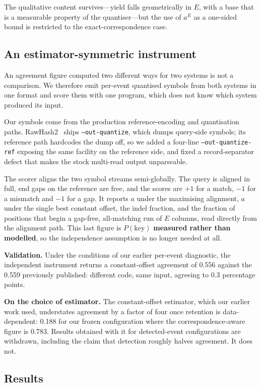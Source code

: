 \documentclass[conference]{IEEEtran}
\begin{document}
The qualitative content survives---yield falls geometrically in $E$, with a base that is a
measurable property of the quantiser---but the use of $a^{E}$ as a one-sided bound is restricted
to the exact-correspondence case.

\subsection{An estimator-symmetric instrument}

An agreement figure computed two different ways for two systems is not a comparison. We
therefore emit per-event quantised symbols from both systems in one format and score them with
one program, which does not know which system produced its input.

Our symbols come from the production reference-encoding and quantisation paths.
RawHash2~\cite{rawhash2} ships
\texttt{--out-quantize}, which dumps query-side symbols; its reference path hardcodes the dump
off, so we added a four-line \texttt{--out-quantize-ref} exposing the same facility on the
reference side, and fixed a record-separator defect that makes the stock multi-read output
unparseable.

The scorer aligns the two symbol streams semi-globally. The query is aligned in full, end gaps
on the reference are free, and the scores are $+1$ for a match, $-1$ for a mismatch and $-1$
for a gap. It reports $a$ under the maximising alignment, $a$ under the single best constant
offset, the indel fraction, and the fraction of positions that begin a gap-free, all-matching
run of $E$ columns, read directly from the alignment path. This last figure is
$P(\mathrm{key})$ \textbf{measured rather than modelled}, so the independence assumption is no
longer needed at all.

\textbf{Validation.} Under the conditions of our earlier per-event diagnostic, the independent
instrument returns a constant-offset agreement of 0.556 against the 0.559 previously published:
different code, same input, agreeing to 0.3 percentage points.

\textbf{On the choice of estimator.} The constant-offset estimator, which our earlier work used,
understates agreement by a factor of four once retention is data-dependent: 0.188 for our frozen
configuration where the correspondence-aware figure is 0.783. Results obtained with it for
detected-event configurations are withdrawn, including the claim that detection roughly halves
agreement. It does not.

\subsection{Results}
\end{document}

